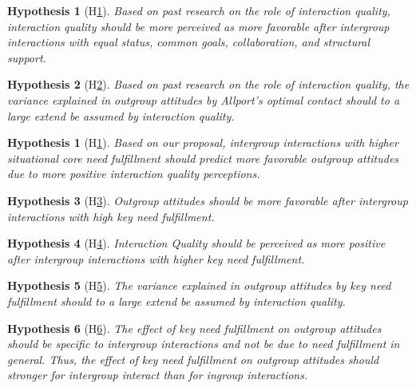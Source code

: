 \documentclass[man, 12pt, a4paper]{apa7}
\theoremstyle{break}
\theoremstyle{plain}
\newtheorem{hyp}{Hypothesis}
\newtheorem{subhyp}{Hypothesis}
\begin{document}
\begin{subhyp}[H\ref{hyp:AllportsQuality}] \label{hyp:AllportsQuality}
\addtolength{\leftskip}{2.5em}
Based on past research on the role of interaction quality, interaction quality should be more perceived as more favorable after intergroup interactions with equal status, common goals, collaboration, and structural support.
\end{subhyp}

\begin{subhyp}[H\ref{hyp:AllportsQualityMediation}] \label{hyp:AllportsQualityMediation}
\addtolength{\leftskip}{2.5em}
Based on past research on the role of interaction quality, the variance explained in outgroup attitudes by Allport's optimal contact should to a large extend be assumed by interaction quality.
\end{subhyp}

\begin{hyp}[H\ref{hyp:keyNeed}] \label{hyp:keyNeed}
Based on our proposal, intergroup interactions with higher situational core need fulfillment should predict more favorable outgroup attitudes due to more positive interaction quality perceptions.
\end{hyp}

\setcounter{subhyp}{0}
\begin{subhyp}[H\ref{hyp:keyNeedPred}] \label{hyp:keyNeedPred}
\addtolength{\leftskip}{2.5em}
Outgroup attitudes should be more favorable after intergroup interactions with high key need fulfillment.
\end{subhyp}

\begin{subhyp}[H\ref{hyp:keyNeedQual}] \label{hyp:keyNeedQual}
\addtolength{\leftskip}{2.5em}
Interaction Quality should be perceived as more positive after intergroup interactions with higher key need fulfillment.
\end{subhyp}

\begin{subhyp}[H\ref{hyp:keyNeedMediation}] \label{hyp:keyNeedMediation}
\addtolength{\leftskip}{2.5em}
The variance explained in outgroup attitudes by key need fulfillment should to a large extend be assumed by interaction quality.
\end{subhyp}

\begin{subhyp}[H\ref{hyp:keyNeedContactType}] \label{hyp:keyNeedContactType}
\addtolength{\leftskip}{2.5em}
The effect of key need fulfillment on outgroup attitudes should be specific to intergroup interactions and not be due to need fulfillment in general. Thus, the effect of key need fulfillment on outgroup attitudes should stronger for intergroup interact than for ingroup interactions. 
\end{subhyp}
\end{document}
